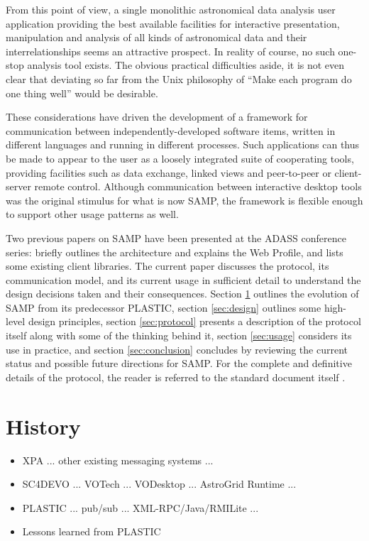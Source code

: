 \documentclass[5p]{elsarticle}
\newcommand{\todo}{\color{gray}}
\begin{document}
From this point of view, a single monolithic astronomical data analysis
user application providing the best available facilities for
interactive presentation, manipulation and analysis of all kinds of
astronomical data and their interrelationships seems an attractive prospect.
In reality of course, no such one-stop analysis tool exists.
The obvious practical difficulties aside, it is not even clear
that deviating so far from the Unix philosophy of
``Make each program do one thing well'' \citep{mcilroy1978}
would be desirable.

These considerations have driven the development of a framework
for communication between independently-developed software items,
written in different languages and running in different processes.
Such applications can thus be made to appear to the user
as a loosely integrated suite of cooperating tools,
providing facilities such as data exchange, linked views and
peer-to-peer or client-server remote control.
Although communication between interactive desktop tools was the
original stimulus for what is now SAMP, the framework is flexible
enough to support other usage patterns as well.

Two previous papers on SAMP have been presented at the ADASS conference
series:
\citet{adassxxi_paper} briefly outlines the architecture and explains
the Web Profile, and \citet{adassxxii_bof} lists some existing
client libraries.
The current paper discusses the protocol,
its communication model, and its current usage
in sufficient detail to understand the design decisions taken
and their consequences.
Section \ref{sec:history} outlines the evolution of SAMP from
its predecessor PLASTIC,
section \ref{sec:design} outlines some high-level design principles,
section \ref{sec:protocol} presents a description of the protocol itself
along with some of the thinking behind it,
section \ref{sec:usage} considers its use in practice, and
section \ref{sec:conclusion} concludes by reviewing the current status
and possible future directions for SAMP.
For the complete and definitive details of the protocol,
the reader is referred to the standard document itself \citep{samp_std}.

{\todo
\section{History} \label{sec:history}
 
  \begin{itemize}
  \item XPA ... other existing messaging systems ...
  \item SC4DEVO ... VOTech ... VODesktop ... AstroGrid Runtime ...
  \item PLASTIC\citep{plastic_note} ... pub/sub ... XML-RPC/Java/RMILite ...
  \item Lessons learned from PLASTIC
  \end{itemize}
}
\end{document}
